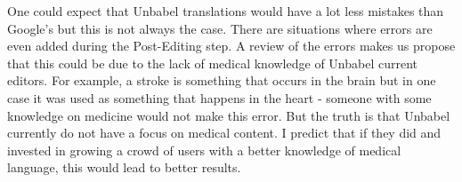 One could expect that Unbabel translations would have a lot less mistakes than Google's but this is not always the case. There are situations where errors are even added during the Post-Editing step. A review of the errors makes us propose that this could be due to the lack of medical knowledge of Unbabel current editors. For example, a stroke is something that occurs in the brain but in one case it was used as something that happens in the heart - someone with some knowledge on medicine would not make this error. But the truth is that Unbabel currently do not have a focus on medical content. I predict that if they did and invested in growing a crowd of users with a better knowledge of medical language, this would lead to better results.


  
